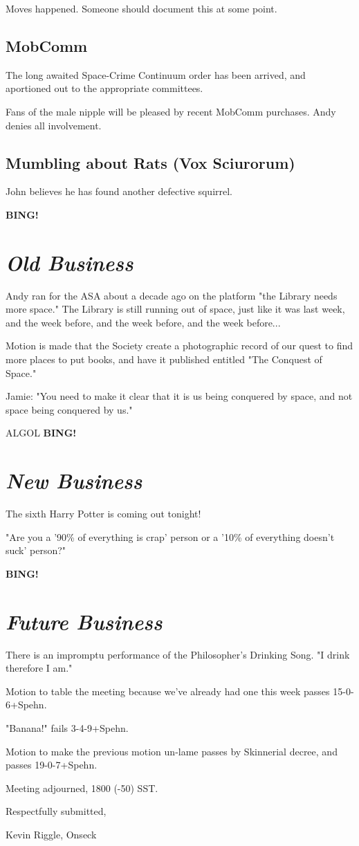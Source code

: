\documentclass[10pt]{article}
\newcommand{\bing}{{\bf BING!} }
\newcommand{\goto}[1]{\bing \vskip 12pt \section*{{\em{#1}}}}
\begin{document}
Moves happened.  Someone should document this at some point.

\subsection*{MobComm}
The long awaited Space-Crime Continuum order has been arrived, and aportioned out to the appropriate committees.

Fans of the male nipple will be pleased by recent MobComm purchases.  Andy denies all involvement.

\subsection*{Mumbling about Rats (Vox Sciurorum)}
John believes he has found another defective squirrel.

\goto{Old Business}
Andy ran for the ASA about a decade ago on the platform "the Library
needs more space."  The Library is still running out of space, just like it was last week, and the week before, and
the week before, and the week before...

Motion is made that the Society create a photographic record of our quest to find more places to put books, and 
have it published entitled "The Conquest of Space."

Jamie: "You need to make it clear that it is us being conquered by space, and not space being conquered by us."

ALGOL
\goto{New Business}

The sixth Harry Potter is coming out tonight!

"Are you a '90\% of everything is crap' person or a '10\% of everything doesn't suck' person?"

\goto{Future Business}

There is an impromptu performance of the Philosopher's Drinking Song.  "I drink therefore I am."

Motion to table the meeting because we've already had one this week passes 15-0-6+Spehn.

"Banana!" fails 3-4-9+Spehn.

Motion to make the previous motion un-lame passes by Skinnerial decree, and passes 19-0-7+Spehn.

\vspace{12pt}

\noindent
Meeting adjourned, 1800 (-50) SST.

\vspace{18pt}

\centerline{Respectfully submitted,}
\centerline{Kevin Riggle, Onseck}
\end{document}
